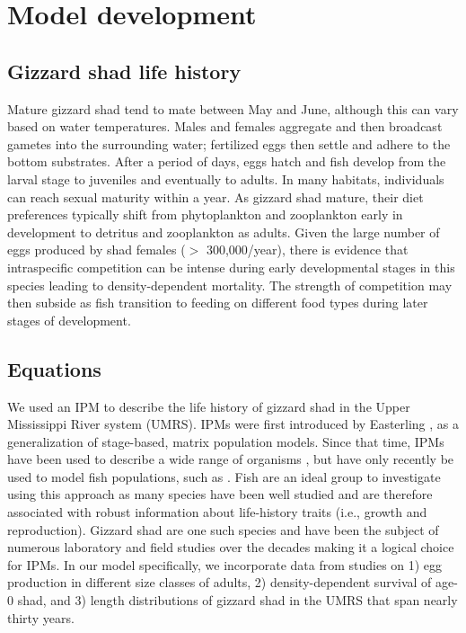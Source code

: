 \documentclass[preprint,review,12pt,authoryear]{elsarticle}
\begin{document}
\section{Model development}
\subsection{Gizzard shad life history}
Mature gizzard shad tend to mate between May and June, although this can vary based on water temperatures. 
Males and females aggregate and then broadcast gametes into the surrounding water; fertilized eggs then settle and adhere to the bottom substrates. 
After a period of days, eggs hatch and fish develop from the larval stage to juveniles and eventually to adults. 
In many habitats, individuals can reach sexual maturity within a year. 
As gizzard shad mature, their diet preferences typically shift from phytoplankton and zooplankton early in development to detritus and zooplankton as adults. 
Given the large number of eggs produced by shad females ($>$ 300,000/year), there is evidence that intraspecific competition can be intense during early developmental stages in this species leading to density-dependent mortality. 
The strength of competition may then subside as fish transition to feeding on different food types during later stages of development.   

\subsection{Equations}
We used an IPM to describe the life history of gizzard shad in the Upper Mississippi River system (UMRS). 
IPMs were first introduced by Easterling \citep{easterling2000size}, as a generalization of stage-based, matrix population models. 
Since that time, IPMs have been used to describe a wide range of organisms \citep{ellner2016data, merow2014advancing, rees2014building}, but have only recently be used to model fish populations, such as \citep{erickson2017integral, liao2019dynamic, white2016fitting, pollesch2022developing}. 
Fish are an ideal group to investigate using this approach as many species have been well studied and are therefore associated with robust information about life-history traits (i.e., growth and reproduction). 
Gizzard shad are one such species and have been the subject of numerous laboratory and field studies over the decades making it a logical choice for IPMs.
In our model specifically, we incorporate data from studies on 1) egg production in different size classes of adults, 2) density-dependent survival of age-0 shad, and 3) length distributions of gizzard shad in the UMRS that span nearly thirty years.
\end{document}
